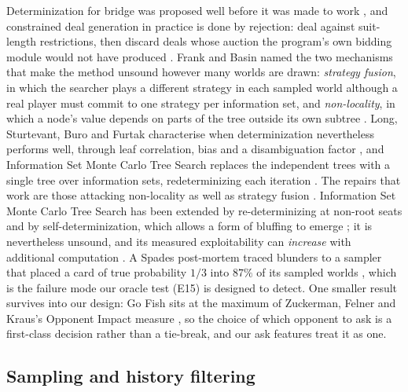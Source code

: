 \documentclass[11pt]{article}
\theoremstyle{definition}
\begin{document}
Determinization for bridge was proposed well before it was made to work
\cite{levy}, and constrained deal generation in practice is done by rejection:
deal against suit-length restrictions, then discard deals whose auction the
program's own bidding module would not have produced
\cite{ginsberg-gib,pavlicek}. Frank and Basin named the two mechanisms that
make the method unsound however many worlds are drawn: \emph{strategy fusion},
in which the searcher plays a different strategy in each sampled world
although a real player must commit to one strategy per information set, and
\emph{non-locality}, in which a node's value depends on parts of the tree
outside its own subtree \cite{frank-basin-ai}. Long, Sturtevant, Buro and
Furtak characterise when determinization nevertheless performs well, through
leaf correlation, bias and a disambiguation factor \cite{long-pimc}, and
Information Set Monte Carlo Tree Search replaces the independent trees with a
single tree over information sets, redeterminizing each iteration
\cite{cowling-ismcts}. The repairs that work are those attacking non-locality
as well as strategy fusion \cite{frank-basin-aaai}. Information Set Monte
Carlo Tree Search has been extended by re-determinizing at non-root seats and
by self-determinization, which allows a form of bluffing to emerge
\cite{goodman-ris,cowling-bluffing}; it is nevertheless unsound, and its
measured exploitability can \emph{increase} with additional computation
\cite{lisy-oos}. A Spades post-mortem traced blunders to a sampler that placed
a card of true probability $1/3$ into $87\%$ of its sampled worlds
\cite{whitehouse-spades}, which is the failure mode our oracle test (E15) is
designed to detect. One smaller result survives into our design: Go Fish sits
at the maximum of Zuckerman, Felner and Kraus's Opponent Impact measure
\cite{zuckerman-mpmix}, so the choice of which opponent to ask is a
first-class decision rather than a tie-break, and our ask features treat it as
one.

\subsection{Sampling and history filtering}
\end{document}

